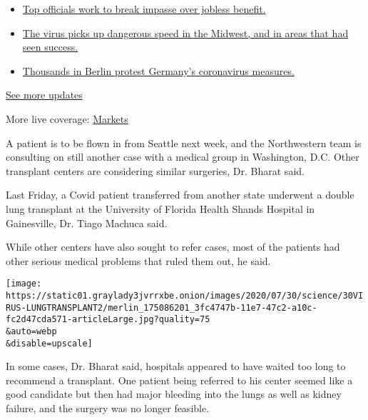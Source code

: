 \begin{itemize}
\tightlist
\item
  \href{https://www.nytimes3xbfgragh.onion/2020/08/01/world/coronavirus-covid-19.html?action=click\&pgtype=Article\&state=default\&region=MAIN_CONTENT_1\&context=storylines_live_updates\#link-3ac56579}{Top
  officials work to break impasse over jobless benefit.}
\item
  \href{https://www.nytimes3xbfgragh.onion/2020/08/01/world/coronavirus-covid-19.html?action=click\&pgtype=Article\&state=default\&region=MAIN_CONTENT_1\&context=storylines_live_updates\#link-8796723}{The
  virus picks up dangerous speed in the Midwest, and in areas that had
  seen success.}
\item
  \href{https://www.nytimes3xbfgragh.onion/2020/08/01/world/coronavirus-covid-19.html?action=click\&pgtype=Article\&state=default\&region=MAIN_CONTENT_1\&context=storylines_live_updates\#link-25930521}{Thousands
  in Berlin protest Germany's coronavirus measures.}
\end{itemize}

\href{https://www.nytimes3xbfgragh.onion/2020/08/01/world/coronavirus-covid-19.html?action=click\&pgtype=Article\&state=default\&region=MAIN_CONTENT_1\&context=storylines_live_updates}{See
more updates}

More live coverage:
\href{https://www.nytimes3xbfgragh.onion/live/2020/07/31/business/stock-market-today-coronavirus?action=click\&pgtype=Article\&state=default\&region=MAIN_CONTENT_1\&context=storylines_live_updates}{Markets}

A patient is to be flown in from Seattle next week, and the Northwestern
team is consulting on still another case with a medical group in
Washington, D.C. Other transplant centers are considering similar
surgeries, Dr. Bharat said.

Last Friday, a Covid patient transferred from another state underwent a
double lung transplant at the University of Florida Health Shands
Hospital in Gainesville, Dr. Tiago Machuca said.

While other centers have also sought to refer cases, most of the
patients had other serious medical problems that ruled them out, he
said.

\texttt{[image: https://static01.graylady3jvrrxbe.onion/images/2020/07/30/science/30VIRUS-LUNGTRANSPLANT2/merlin\_175086201\_3fc4747b-11e7-47c2-a10c-fc2d47cda571-articleLarge.jpg?quality=75\\\&auto=webp\\\&disable=upscale]}

In some cases, Dr. Bharat said, hospitals appeared to have waited too
long to recommend a transplant. One patient being referred to his center
seemed like a good candidate but then had major bleeding into the lungs
as well as kidney failure, and the surgery was no longer feasible.

